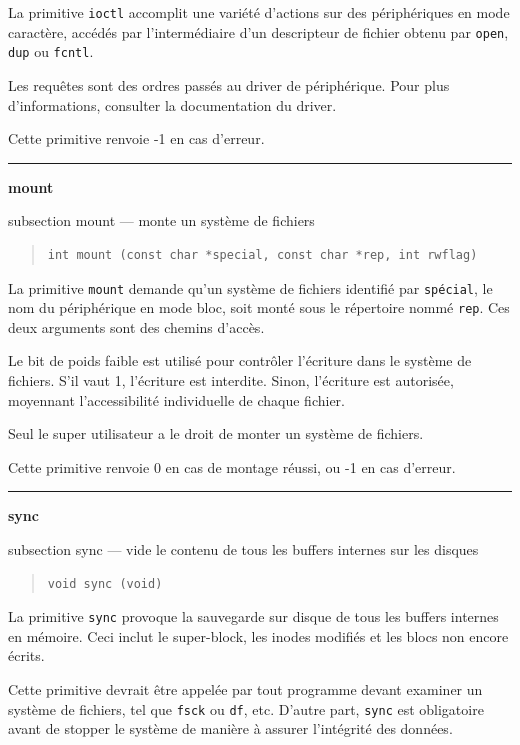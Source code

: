 \documentclass [twoside] {report}
\newcommand {\primitive} [1]
    {
	\phantomsection
	{\large \textbf {#1}}
	\addcontentsline {toc} {subsection} {#1}
    }
\newcommand {\separation}
    {
	\vspace {5mm}
	\nopagebreak
	\hrule
    }
\begin{document}
La primitive \texttt {ioctl} accomplit une variété
d'actions sur des périphériques en mode caractère,
accédés par l'intermédiaire d'un descripteur de
fichier obtenu par \texttt {open}, \texttt {dup} ou \texttt {fcntl}.

Les requêtes sont des ordres passés au driver de
périphérique. Pour plus d'informations, consulter
la documentation du driver.

Cette primitive renvoie -1 en cas d'erreur.




\separation
\primitive {mount} --- monte un système de fichiers

\begin {quote}
\begin {verbatim}
int mount (const char *special, const char *rep, int rwflag)
\end{verbatim}
\end {quote}

La primitive \texttt {mount} demande qu'un système de
fichiers identifié par \texttt {spécial}, le nom du périphérique en
mode bloc, soit monté sous le répertoire nommé
\texttt {rep}. Ces deux arguments sont des chemins
d'accès.

Le bit de poids faible est utilisé pour contrôler
l'écriture dans le système de fichiers. S'il vaut
1, l'écriture est interdite. Sinon, l'écriture est
autorisée, moyennant l'accessibilité individuelle
de chaque fichier.

Seul le super utilisateur a le droit de monter un
système de fichiers.

Cette primitive renvoie 0 en cas de montage
réussi, ou -1 en cas d'erreur.




\separation
\primitive {sync} --- vide le contenu de tous les buffers internes sur les disques

\begin {quote}
\begin {verbatim}
void sync (void)
\end{verbatim}
\end {quote}

La primitive \texttt {sync} provoque la sauvegarde sur
disque de tous les buffers internes en mémoire.
Ceci inclut le super-block, les inodes modifiés et
les blocs non encore écrits.

Cette primitive devrait être appelée par tout
programme devant examiner un système de fichiers,
tel que \texttt {fsck} ou \texttt {df}, etc. D'autre part,
\texttt {sync} est obligatoire avant de stopper le
système de manière à assurer l'intégrité des
données.
\end{document}
